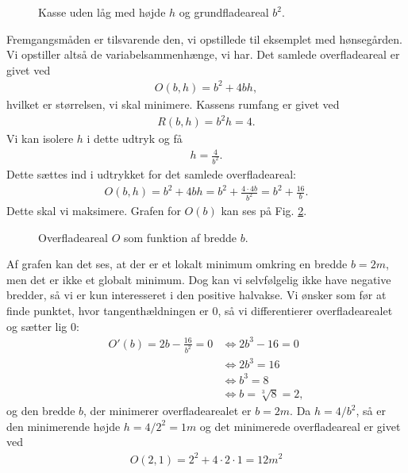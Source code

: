 \begin{exa}
\begin{figure}[H]
\caption{Kasse uden låg med højde $h$ og grundfladeareal $b^2$.}
\label{fig:kasse}
\end{figure}
Fremgangsmåden er tilsvarende den, vi opstillede til eksemplet med hønsegården. Vi opstiller altså de variabelsammenhænge, vi har. Det samlede overfladeareal er givet ved
\begin{align*}
O(b,h) = b^2+4bh,
\end{align*}
hvilket er størrelsen, vi skal minimere. Kassens rumfang er givet ved
\begin{align*}
R(b,h) = b^2h = 4.
\end{align*}
Vi kan isolere $h$ i dette udtryk og få
\begin{align*}
h = \frac{4}{b^2}.
\end{align*}
Dette sættes ind i udtrykket for det samlede overfladeareal:
\begin{align*}
O(b,h) = b^2+ 4bh = b^2 + \frac{4\cdot4b}{b^2} = b^2+\frac{16}{b}.
\end{align*}
Dette skal vi maksimere. Grafen for $O(b)$ kan ses på Fig. \ref{fig:kassegraf}.
\begin{figure}[H]
	\centering
	\caption{Overfladeareal $O$ som funktion af bredde $b$.}
	\label{fig:kassegraf}
\end{figure}

Af grafen kan det ses, at der er et lokalt minimum omkring en bredde $b=2m$, men det er ikke et globalt minimum. Dog kan vi selvfølgelig ikke have negative bredder, så vi er kun interesseret i den positive halvakse. Vi ønsker som før at finde punktet, hvor tangenthældningen er $0$, så vi differentierer overfladearealet og sætter lig $0$:
\begin{align*}
O'(b) = 2b-\frac{16}{b^2}=0&\Leftrightarrow 2b^3-16=0\\
						&\Leftrightarrow 2b^3 = 16\\
						&\Leftrightarrow b^3 = 8\\
						&\Leftrightarrow b = \sqrt[3]{8} = 2,
\end{align*}
og den bredde $b$, der minimerer overfladearealet er $b=2m$. Da $h=4/b^2$, så er den minimerende højde $h=4/2^2=1m$ og det minimerede overfladeareal er givet ved
\begin{align*}
O(2,1) = 2^2+4\cdot 2\cdot 1 = 12m^2
\end{align*}
\end{exa}

